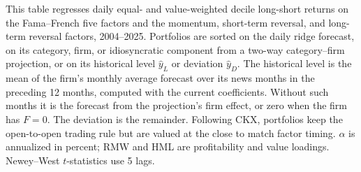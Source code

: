 \begin{table}[htbp]
\centering
\caption{Factor Alphas of Forecast-Component Portfolios}
\label{tab:tabA_factors}
\begin{minipage}{\linewidth}\footnotesize
This table regresses daily equal- and value-weighted decile long-short returns on the Fama--French five factors and the momentum, short-term reversal, and long-term reversal factors, 2004--2025. Portfolios are sorted on the daily ridge forecast, on its category, firm, or idiosyncratic component from a two-way category--firm projection, or on its historical level $\hat y_L$ or deviation $\hat y_D$. The historical level is the mean of the firm's monthly average forecast over its news months in the preceding 12 months, computed with the current coefficients. Without such months it is the forecast from the projection's firm effect, or zero when the firm has $F=0$. The deviation is the remainder. Following CKX, portfolios keep the open-to-open trading rule but are valued at the close to match factor timing. $\alpha$ is annualized in percent; RMW and HML are profitability and value loadings. Newey--West $t$-statistics use 5 lags.
\end{minipage}
\medskip


\end{table}
